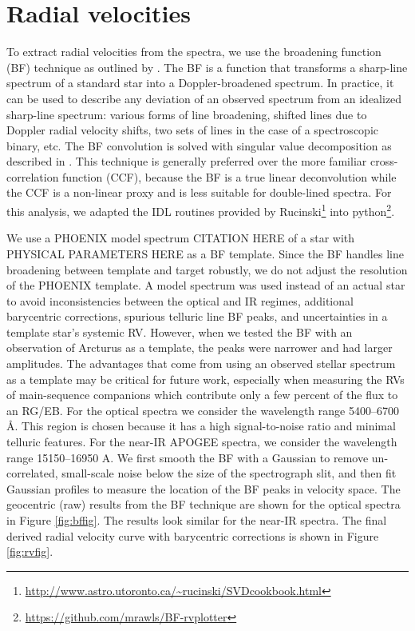 \section{Radial velocities}\label{rvs}
To extract radial velocities from the spectra, we use the broadening function (BF) technique as outlined by \citet{ruc02}. The BF is a function that transforms a sharp-line spectrum of a standard star into a Doppler-broadened spectrum. In practice, it can be used to describe any deviation of an observed spectrum from an idealized sharp-line spectrum: various forms of line broadening, shifted lines due to Doppler radial velocity shifts, two sets of lines in the case of a spectroscopic binary, etc. The BF convolution is solved with singular value decomposition as described in \citet{ruc02}. This technique is generally preferred over the more familiar cross-correlation function (CCF), because the BF is a true linear deconvolution while the CCF is a non-linear proxy and is less suitable for double-lined spectra. For this analysis, we adapted the IDL routines provided by Rucinski\footnote{\url{http://www.astro.utoronto.ca/~rucinski/SVDcookbook.html}} into python\footnote{\url{https://github.com/mrawls/BF-rvplotter}}.

We use a PHOENIX model spectrum CITATION HERE of a star with PHYSICAL PARAMETERS HERE as a BF template. Since the BF handles line broadening between template and target robustly, we do not adjust the resolution of the PHOENIX template. A model spectrum was used instead of an actual star to avoid inconsistencies between the optical and IR regimes, additional barycentric corrections, spurious telluric line BF peaks, and uncertainties in a template star's systemic RV. However, when we tested the BF with an observation of Arcturus as a template, the peaks were narrower and had larger amplitudes. The advantages that come from using an observed stellar spectrum as a template may be critical for future work, especially when measuring the RVs of main-sequence companions which contribute only a few percent of the flux to an RG/EB.
For the optical spectra we consider the wavelength range 5400--6700 \AA. This region is chosen because it has a high signal-to-noise ratio and minimal telluric features. For the near-IR APOGEE spectra, we consider the wavelength range 15150--16950 A. We first smooth the BF with a Gaussian to remove un-correlated, small-scale noise below the size of the spectrograph slit, and then fit Gaussian profiles to measure the location of the BF peaks in velocity space. The geocentric (raw) results from the BF technique are shown for the optical spectra in Figure \ref{fig:bffig}. The results look similar for the near-IR spectra. The final derived radial velocity curve with barycentric corrections is shown in Figure \ref{fig:rvfig}.
